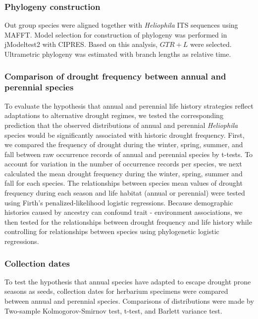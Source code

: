 \documentclass[man,floatsintext]{apa6}
\theoremstyle{definition}
\theoremstyle{definition}
\theoremstyle{definition}
\theoremstyle{remark}
\begin{document}
\hypertarget{phylogeny-construction}{%
\subsubsection{Phylogeny construction}\label{phylogeny-construction}}

Out group species were aligned together with \emph{Heliophila} ITS
sequences using MAFFT. Model selection for construction of phylogeny was
performed in jModeltest2 with CIPRES. Based on this analysis,
\(GTR + L\) were selected. Ultrametric phylogeny was estimated with
branch lengths as relative time.

\hypertarget{comparison-of-drought-frequency-between-annual-and-perennial-species}{%
\subsubsection{Comparison of drought frequency between annual and
perennial
species}\label{comparison-of-drought-frequency-between-annual-and-perennial-species}}

To evaluate the hypothesis that annual and perennial life history
strategies reflect adaptations to alternative drought regimes, we tested
the corresponding prediction that the observed distributions of annual
and perennial \emph{Heliophila} species would be significantly
associated with historic drought frequency. First, we compared the
frequency of drought during the winter, spring, summer, and fall between
raw occurrence records of annual and perennial species by t-tests. To
account for variation in the number of occurrence records per species,
we next calculated the mean drought frequency during the winter, spring,
summer and fall for each species. The relationships between species mean
values of drought frequency during each season and life habitat (annual
or perennial) were tested using Firth's penalized-likelihood logistic
regressions. Because demographic histories caused by ancestry can
confound trait - environment associations, we then tested for the
relationships between drought frequency and life history while
controlling for relationships between species using phylogenetic
logistic regressions.

\hypertarget{collection-dates}{%
\subsubsection{Collection dates}\label{collection-dates}}

To test the hypothesis that annual species have adapted to escape
drought prone seasons as seeds, collection dates for herbarium specimens
were compared between annual and perennial species. Comparisons of
distributions were made by Two-sample Kolmogorov-Smirnov test, t-test,
and Barlett variance test.
\end{document}
